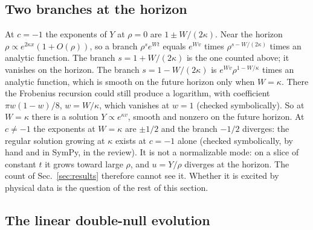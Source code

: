 \documentclass[11pt]{article}
\theoremstyle{plain}
\begin{document}
\subsection{Two branches at the horizon}\label{sec:branches}

At $c=-1$ the exponents of $Y$ at $\rho=0$ are $1\pm W/(2\kappa)$. Near the horizon $\rho\propto e^{2\kappa x}(1+O(\rho))$, so
a branch $\rho^s e^{Wt}$ equals $e^{Wv}$ times $\rho^{s-W/(2\kappa)}$ times an analytic function. The branch $s=1+W/(2\kappa)$
is the one counted above; it vanishes on the horizon. The branch $s=1-W/(2\kappa)$ is $e^{Wv}\rho^{1-W/\kappa}$ times an
analytic function, which is smooth on the future horizon only when $W=\kappa$. There the Frobenius recursion could still
produce a logarithm, with coefficient $\pi w(1-w)/8$, $w=W/\kappa$, which vanishes at $w=1$ (checked symbolically). So at
$W=\kappa$ there is a solution $Y\propto e^{\kappa v}$, smooth and nonzero on the future horizon. At $c\ne-1$ the exponents at
$W=\kappa$ are $\pm1/2$ and the branch $-1/2$ diverges: the regular solution growing at $\kappa$ exists at $c=-1$ alone
(checked symbolically, by hand and in SymPy, in the review). It is not a normalizable mode: on a slice of constant $t$ it
grows toward large $\rho$, and $u=Y/\rho$ diverges at the horizon. The count of Sec.~\ref{sec:results} therefore cannot see
it. Whether it is excited by physical data is the question of the rest of this section.

\subsection{The linear double-null evolution}\label{sec:dn}
\end{document}
